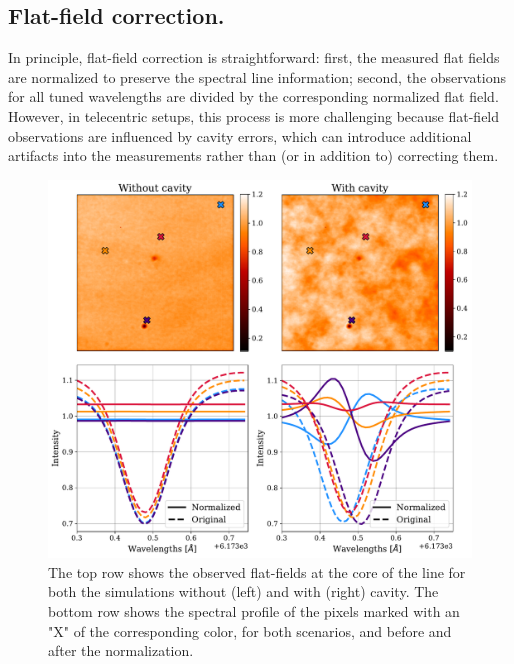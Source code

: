 \subsection{Flat-field correction.}

In principle, flat-field correction is straightforward: first, the measured flat fields are normalized to preserve the spectral line information; second, the observations for all tuned wavelengths are divided by the corresponding normalized flat field. However, in telecentric setups, this process is more challenging because flat-field observations are influenced by cavity errors, which can introduce additional artifacts into the measurements rather than (or in addition to) correcting them.


\begin{figure}
  \begin{minipage}[c]{0.7\textwidth}
    \includegraphics[width=\textwidth]{figures/Mancha/Flat_field_normalization.pdf}
  \end{minipage}\hfill
  \begin{minipage}[c]{0.27\textwidth}
    \caption{
      The top row shows the observed flat-fields at the core of the line for both the simulations without (left) and with (right) cavity. The bottom row shows the spectral profile of the pixels marked with an "X" of the corresponding color, for both scenarios, and before and after the normalization.      
    \label{fig_mancha: flat_field normalization}} 
  \end{minipage}
\end{figure}

